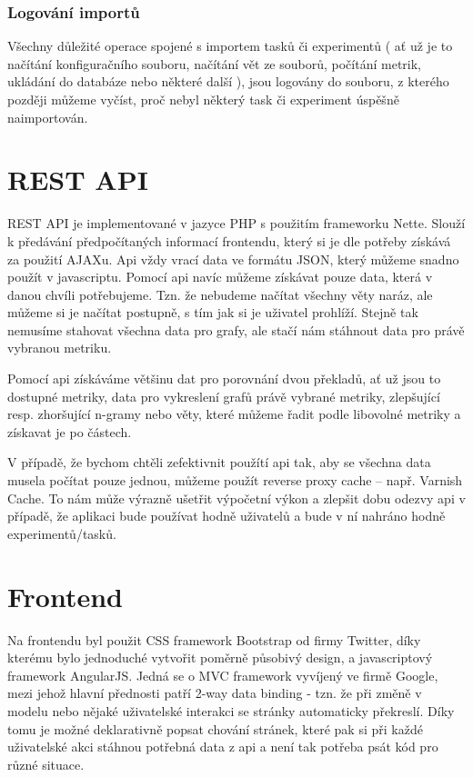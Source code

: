 \subsubsection{Logování importů}
Všechny důležité operace spojené s importem tasků či experimentů
  ( ať už je to načítání konfiguračního souboru, načítání vět ze souborů,
  počítání metrik, ukládání do databáze nebo některé další ), 
  jsou logovány do souboru,
  z kterého později můžeme vyčíst,
  proč nebyl některý task či experiment úspěšně naimportován. 


\section{REST API}
REST API je implementované v jazyce PHP s použitím frameworku Nette.
Slouží k předávání předpočítaných informací frontendu,
  který si je dle potřeby získává za použití AJAXu.
Api vždy vrací data ve formátu JSON,
  který můžeme snadno použít v javascriptu.
Pomocí api navíc můžeme získávat pouze data,
  která v danou chvíli potřebujeme.
Tzn. že nebudeme načítat všechny věty naráz,
  ale můžeme si je načítat postupně,
  s tím jak si je uživatel prohlíží.
Stejně tak nemusíme stahovat všechna data pro grafy,
  ale stačí nám stáhnout data pro právě vybranou metriku.

Pomocí api získáváme většinu dat pro porovnání dvou překladů,
  ať už jsou to dostupné metriky,
  data pro vykreslení grafů právě vybrané metriky,
  zlepšující resp. zhoršující n-gramy
  nebo věty,
  které můžeme řadit podle libovolné metriky a získavat je po částech.

V případě, že bychom chtěli zefektivnit použítí api tak,
  aby se všechna data musela počítat pouze jednou,
  můžeme použít reverse proxy cache -- např. Varnish Cache.
To nám může výrazně ušetřit výpočetní výkon a zlepšit dobu odezvy api v případě,
  že aplikaci bude používat hodně uživatelů
  a bude v ní nahráno hodně experimentů/tasků.

\section{Frontend}
Na frontendu byl použit CSS framework Bootstrap od firmy Twitter,
  díky kterému bylo jednoduché vytvořit poměrně působivý design,
  a javascriptový framework AngularJS.
Jedná se o MVC framework vyvíjený ve firmě Google,
  mezi jehož hlavní přednosti patří 2-way data binding -
  tzn. že při změně v modelu nebo nějaké uživatelské interakci se stránky automaticky překreslí.
Díky tomu je možné deklarativně popsat chování stránek,
  které pak si při každé uživatelské akci stáhnou potřebná data z api
  a není tak potřeba psát kód pro různé situace.

